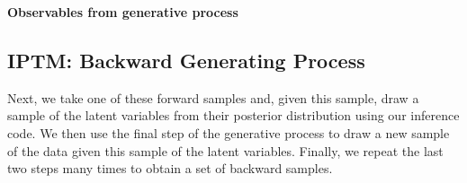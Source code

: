 \documentclass[a4paper]{article}
\begin{document}
\begin{algorithm}[H]
	  	\textbf{Observables from generative process}\\
  			\label{alg:forward}
  		\end{algorithm}
  		   
 \subsection{IPTM: Backward Generating Process} \label{subsec: Backward Generative Process}
                  Next, we take one of these
                  forward samples and, given this sample, draw a sample of the latent
                  variables from their posterior distribution using our inference
                  code. We then use the final step of the generative process to draw a
                  new sample of the data given this sample of the latent
                  variables. Finally, we repeat the last two steps many times to
                  obtain a set of backward samples. 
                  
\end{document}
